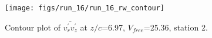 \begin{figure}[H]
\centering
\texttt{[image: figs/run\_16/run\_16\_rw\_contour]}
\caption{Contour plot of $\overline{v_{r}^{\prime} v_{z}^{\prime}}$ at $z/c$=6.97, $V_{free}$=25.36, station 2.}
\label{fig:run_16_rw_contour}
\end{figure}


